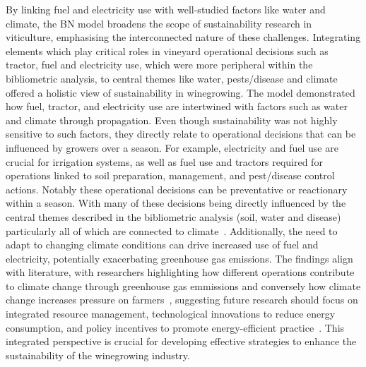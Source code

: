 \documentclass[fleqn,10pt]{wlscirep}
\begin{document}
By linking fuel and electricity use with well-studied factors like water and climate, the BN model broadens the scope of sustainability research in viticulture, emphasising the interconnected nature of these challenges. Integrating elements which play critical roles in vineyard operational decisions such as tractor, fuel and electricity use, which were more peripheral within the bibliometric analysis, to central themes like water, pests/disease and climate offered a holistic view of sustainability in winegrowing. The model demonstrated how fuel, tractor, and electricity use are intertwined with factors such as water and climate through propagation. Even though sustainability was not highly sensitive to such factors, they directly relate to operational decisions that can be influenced by growers over a season. For example, electricity and fuel use are crucial for irrigation systems, as well as fuel use and tractors required for operations linked to soil preparation, management, and pest/disease control actions. Notably these operational decisions can be preventative or reactionary within a season. With many of these decisions being directly influenced by the central themes described in the bibliometric analysis (soil, water and disease) particularly all of which are connected to climate~. Additionally, the need to adapt to changing climate conditions can drive increased use of fuel and electricity, potentially exacerbating greenhouse gas emissions. The findings align with literature, with researchers highlighting how different operations contribute to climate change through greenhouse gas emmissions  and conversely how climate change increases pressure on farmers~, suggesting future research should focus on integrated resource management, technological innovations to reduce energy consumption, and policy incentives to promote energy-efficient practice~. This integrated perspective is crucial for developing effective strategies to enhance the sustainability of the winegrowing industry.
\end{document}
